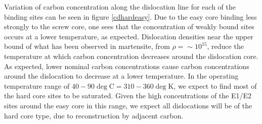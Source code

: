 \documentclass[a4paper,11pt]{article}
\begin{document}
Variation of carbon concentration along the dislocation line for each of the binding sites can be
seen in figure \ref{cdhardeasy}. Due to the easy core binding less strongly to the screw core, one
sees that the concentration of weakly bound sites occurs at a lower temperature, as
expected. Dislocation densities near the upper bound of what has been observed in martensite,
from \(\rho = \sim10^{15}\), reduce the temperature at which carbon concentration decreases around the
dislocation core. As expected, lower nominal carbon concentrations cause carbon concentrations
around the dislocation to decrease at a lower temperature. In the operating temperature range of
\(40-90\deg\text{C} = 310-360\deg\text{K}\), we expect to find most of the hard core sites to be
saturated. Given the high concentrations of the E1/E2 sites around the easy core in this range, we expect all
dislocations will be of the hard core type, due to reconstruction by adjacent carbon. 
\end{document}
